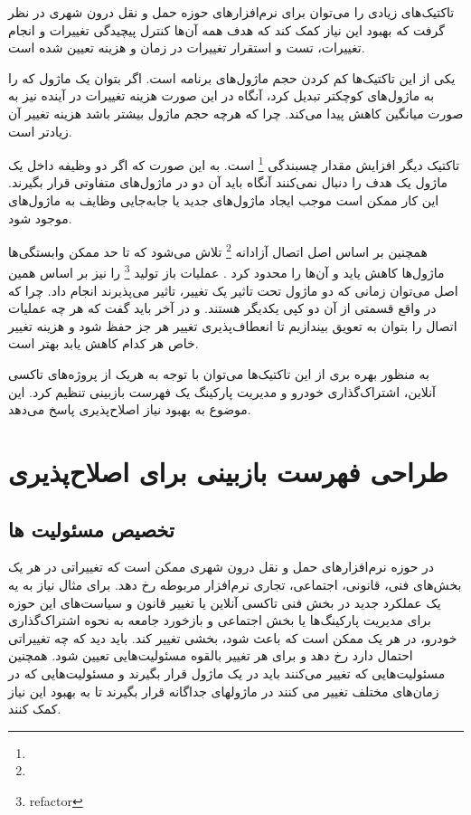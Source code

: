  تاکتیک‌های زیادی را می‌توان برای نرم‌افزار‌های حوزه حمل و‌ نقل درون شهری در نظر گرفت که بهبود این نیاز کمک کند که هدف همه آن‌ها کنترل پیچیدگی تغییرات و انجام تغییرات، تست و استقرار تغییرات در زمان و هزینه تعیین شده است.

یکی از این تاکتیک‌ها کم کردن حجم ماژول‌های برنامه است. اگر بتوان یک ماژول که را به ماژول‌های کوچکتر تبدیل کرد، آنگاه در این صورت هزینه تغییرات در آینده نیز به صورت میانگین کاهش پیدا می‌کند.
چرا که هرچه حجم ماژول بیشتر باشد هزینه تغییر آن زیادتر است.

تاکتیک دیگر افزایش مقدار چسبندگی
\footnote{}
است. به این صورت که اگر دو وظیفه داخل یک ماژول یک هدف را دنبال نمی‌کنند آنگاه باید آن دو در ماژول‌های متفاوتی قرار بگیرند.
این کار ممکن است موجب ایجاد ماژول‌های جدید یا جابه‌جایی وظایف به ماژول‌های موجود شود.

همچنین بر اساس اصل اتصال آزادانه
\footnote{} 
تلاش می‌شود که تا حد ممکن وابستگی‌ها ماژول‌ها کاهش یاید و آن‌ها را محدود کرد \cite{loose_coupling}.
 عملیات باز تولید
\footnote{refactor}
را نیز بر اساس همین اصل می‌توان زمانی که دو ماژول تحت تاثیر یک تغییر، تاثیر می‌پذیرند انجام داد. چرا که در واقع قسمتی از آن دو کپی یکدیگر هستند.
و در آخر باید گفت که هر چه عملیات اتصال را بتوان به تعویق بیندازیم تا انعطاف‌پذیری تغییر هر جز حفظ شود و هزینه تغییر خاص هر کدام کاهش یابد بهتر است.


به منظور بهره بری از این تاکتیک‌ها می‌توان با توجه به هریک از پروژه‌های تاکسی آنلاین، اشتراک‌گذاری خودرو و مدیریت پارکینگ یک فهرست بازبینی تنظیم کرد. این موضوع به بهبود نیاز اصلاح‌پذیری پاسخ می‌دهد.

\section{طراحی فهرست بازبینی برای اصلا‌ح‌پذیری}
\subsection{تخصیص مسئولیت ها} 
در حوزه نرم‌افزارهای حمل و نقل درون شهری ممکن است که تغییراتی در هر یک بخش‌های فنی، قانونی، اجتماعی، تجاری نرم‌افزار مربوطه رخ دهد. برای مثال نیاز به یه یک عملکرد جدید در بخش فنی تاکسی آنلاین یا تغییر قانون و سیاست‌های این حوزه برای مدیریت پارکینگ‌ها یا بخش اجتماعی و بازخورد جامعه به نحوه  اشتراک‌گذاری خودرو، در هر یک ممکن است که باعث شود، بخشی تغییر کند. 
باید دید که چه تغییراتی احتمال دارد رخ دهد و برای هر تغییر بالقوه مسئولیت‌هایی تعیین شود. 
همچنین مسئولیت‌هایی که تغییر می‌کنند باید در یک ماژول قرار بگیرند و مسئولیت‌هایی که در زمان‌های مختلف تغییر می کنند در ماژولهای جداگانه قرار بگیرند تا به بهبود این نیاز کمک کنند.

